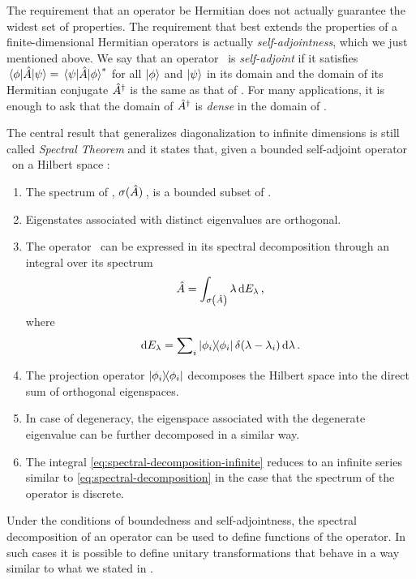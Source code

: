             The requirement that an operator be Hermitian does not actually guarantee the widest set of properties. The requirement that best extends the properties of a finite-dimensional Hermitian operators is actually \emph{self-adjointness}, which we just mentioned above. We say that an operator \hA\ is \emph{self-adjoint} if it satisfies $\mel{\phi}{\ensuremath{\hat{A}}}{\psi} = \mel{\psi}{\ensuremath{\hat{A}}}{\phi}^*$ for all $\ket{\phi}$ and $\ket{\psi}$ in its domain and the domain of its Hermitian conjugate $\hat{A}^\dag$ is the same as that of \hA. For many applications, it is enough to ask that the domain of $\hat{A}^\dag$ is \emph{dense} in the domain of \hA.

            The central result that generalizes diagonalization to infinite dimensions is still called \emph{Spectral Theorem} and it states that, given a bounded self-adjoint operator \hA\ on a Hilbert space \cite{Bernardini1993-iy}:
            \begin{enumerate}[label = \textit{\roman{enumi}}.]
                \item The spectrum of \hA, $\sigma\pqty*{\hA}$, is a bounded subset of \bbR.
                \item Eigenstates associated with distinct eigenvalues are orthogonal. \label{p:orthogonality}
                \item The operator \hA\ can be expressed in its spectral decomposition through an integral over its spectrum
                    \begin{equation}
                        \label{eq:spectral-decomposition-infinite}
                        \hA = \int\nolimits_{\sigma\pqty{\hA}} \lambda \dd{E_\lambda}
                        \mycomma
                    \end{equation}
                    where
                    \begin{equation*}
                        \dd{E_\lambda} = \sum\nolimits_i \dyad{\phi_i}{\phi_i}\delta\pqty{\lambda - \lambda_i}\dd{\lambda}
                        \myperiod
                    \end{equation*}
                \item The projection operator $\dyad{\phi_i}{\phi_i}$ decomposes the Hilbert space into the direct sum of orthogonal eigenspaces.
                \item In case of degeneracy, the eigenspace associated with the degenerate eigenvalue can be further decomposed in a similar way.
                \item The integral \eqref{eq:spectral-decomposition-infinite} reduces to an infinite series similar to \eqref{eq:spectral-decomposition} in the case that the spectrum of the operator is discrete.
            \end{enumerate}

            Under the conditions of boundedness and self-adjointness, the spectral decomposition of an operator can be used to define functions of the operator. In such cases it is possible to define unitary transformations that behave in a way similar to what we stated in .
